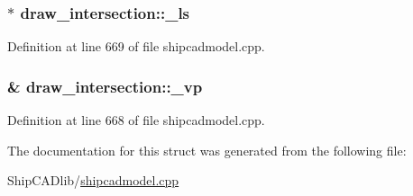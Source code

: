 \subsubsection[{\texorpdfstring{\+\_\+ls}{_ls}}]{$\ast$ draw\+\_\+intersection\+::\+\_\+ls}\hypertarget{structdraw__intersection_a5f59d55f5e41a2585af4fea6a4d93374}{}\label{structdraw__intersection_a5f59d55f5e41a2585af4fea6a4d93374}


Definition at line 669 of file shipcadmodel.\+cpp.

\subsubsection[{\texorpdfstring{\+\_\+vp}{_vp}}]{\& draw\+\_\+intersection\+::\+\_\+vp}\hypertarget{structdraw__intersection_a4550bf7c1203e48abdc041e4e248c5f7}{}\label{structdraw__intersection_a4550bf7c1203e48abdc041e4e248c5f7}


Definition at line 668 of file shipcadmodel.\+cpp.



The documentation for this struct was generated from the following file\+:\begin{DoxyCompactItemize}
\item 
Ship\+C\+A\+Dlib/\hyperlink{shipcadmodel_8cpp}{shipcadmodel.\+cpp}\end{DoxyCompactItemize}
